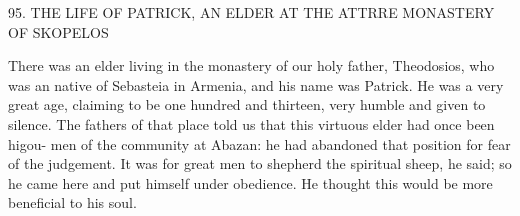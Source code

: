 95. THE LIFE OF PATRICK, AN ELDER AT THE
ATTRRE MONASTERY OF SKOPELOS

There was an elder living in the monastery of our holy father,
Theodosios, who was an native of Sebasteia in Armenia, and his
name was Patrick. He was a very great age, claiming to be one
hundred and thirteen, very humble and given to silence. The fathers
of that place told us that this virtuous elder had once been higou-
men of the community at Abazan: he had abandoned that position
for fear of the judgement. It was for great men to shepherd the
spiritual sheep, he said; so he came here and put himself under
obedience. He thought this would be more beneficial to his soul.
